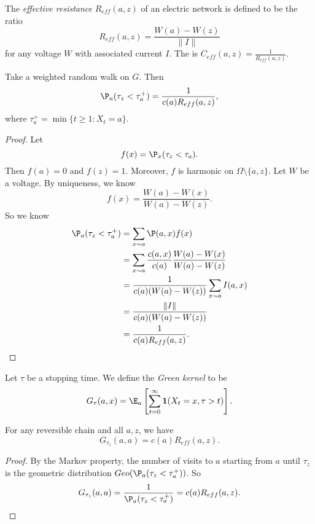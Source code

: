 \documentclass[a4paper]{article}
\begin{document}
\begin{defi}
  The \emph{effective resistance} $R_{eff}(a, z)$ of an electric network is defined to be the ratio
  \[
    R_{eff}(a, z) = \frac{W(a) - W(z)}{\|I\|}
  \]
  for any voltage $W$ with associated current $I$. The  is $C_{eff}(a, z) = \frac{1}{R_{eff}(a, z)}$.
\end{defi}

\begin{prop}
  Take a weighted random walk on $G$. Then
  \[
    \P_a(\tau_z < \tau_a^+) = \frac{1}{c(a) R_{eff}(a, z)},
  \]
  where $\tau_a^+ = \min \{t \geq 1: X_t = a\}$.
\end{prop}

\begin{proof}
  Let
  \[
    f(x) = \P_x(\tau_z < \tau_a).
  \]
  Then $f(a) = 0$ and $f(z) = 1$. Moreover, $f$ is harmonic on $\Omega \setminus \{a, z\}$. Let $W$ be a voltage. By uniqueness, we know
  \[
    f(x) = \frac{W(a) - W(x)}{W(a) - W(z)}.
  \]
  So we know
  \begin{align*}
    \P_a(\tau_z < \tau_a^+) &= \sum_{x \sim a} \P(a, x) f(x) \\
    &= \sum_{x \sim a} \frac{c(a, x)}{c(a)} \frac{W(a) - W(x)}{W(a) - W(z)}\\
    &= \frac{1}{c(a) (W(a) - W(z))} \sum_{x \sim a}I(a, x)\\
    &= \frac{\|I\|}{c(a) (W(a) - W(z))}\\
    &= \frac{1}{c(a) R_{eff}(a, z)}.
  \end{align*}
\end{proof}

\begin{defi}
  Let $\tau$ be a stopping time. We define the \emph{Green kernel} to be
  \[
    G_\tau(a, x) = \E_a \left[ \sum_{t = 0}^\infty \mathbf{1}(X_t = x, \tau > t)\right].
  \]
\end{defi}

\begin{cor}
  For any reversible chain and all $a, z$, we have
  \[
    G_{\tau_z}(a, a) = c(a) R_{eff}(a, z).
  \]
\end{cor}

\begin{proof}
  By the Markov property, the number of visits to $a$ starting from $a$ until $\tau_z$ is the geometric distribution $Geo(\P_a(\tau_z < \tau_a^+))$. So
  \[
    G_{\tau_z}(a, a) = \frac{1}{\P_a(\tau_z < \tau_a^+)} = c(a) R_{eff}(a, z).
  \]
\end{proof}
\end{document}
